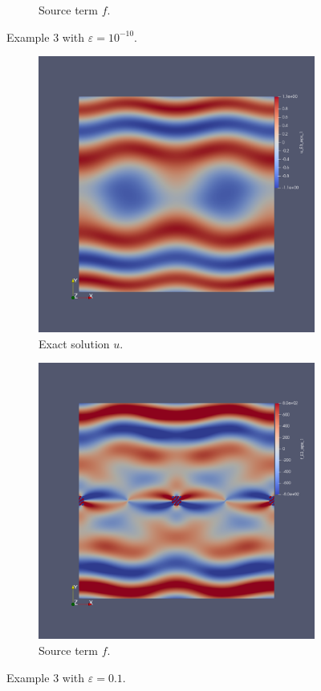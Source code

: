 \documentclass[12pt,a4paper]{article}
\begin{document}
\begin{figure}[H]
\begin{subfigure}{0.5\textwidth}
     \caption{Source term $f$.}
 \end{subfigure}
 \caption{Example $3$ with $\varepsilon = 10^{-10}$.} \label{E3_uf}
\end{figure}
\begin{figure}[H]
 \begin{subfigure}{0.5\textwidth}
     \includegraphics[width=\textwidth]{Pics/uf/U_E3_ep1.png}
     \caption{Exact solution $u$.}
 \end{subfigure}
   \begin{subfigure}{0.5\textwidth}
     \includegraphics[width=\textwidth]{Pics/uf/F_E3_eps_1.png}
     \caption{Source term $f$.}
 \end{subfigure}
 \caption{Example $3$ with $\varepsilon = 0.1$.} \label{E3_uf_01}
\end{figure}
\end{document}
